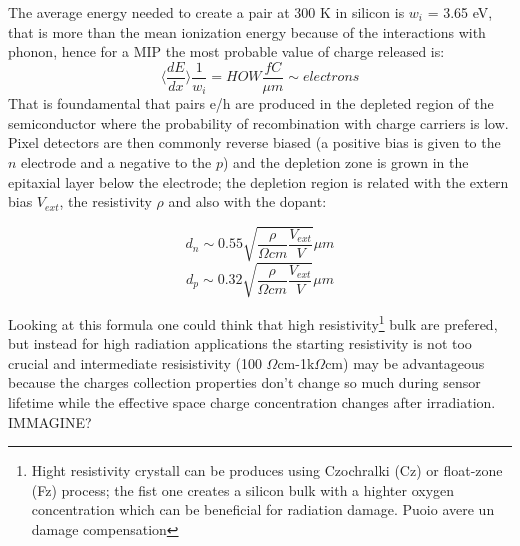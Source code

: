 \begin{titlepage}
The average energy needed to create a pair at 300 K in silicon is $w_i$ = 3.65 eV, that is more than the mean ionization energy because of the interactions with phonon, hence for a MIP the most probable value of charge released is: 
\begin{equation}
   \langle \frac{dE}{dx}\rangle \frac{1}{w_i} = HOW \frac{fC}{\mu m} \sim electrons
\end{equation}
That is foundamental that pairs e/h are produced in the depleted region of the semiconductor where the probability of recombination with charge carriers is low.\\
Pixel detectors are then commonly reverse biased (a positive bias is given to the $n$ electrode and a negative to the $p$) and the depletion zone is grown in the epitaxial layer below the electrode; the depletion region is related with the extern bias $V_{ext}$, the resistivity $\rho$ and also with the dopant:
\begin{multicols}{2}
\begin{equation}
   d_{n} \sim 0.55 \sqrt{\frac{\rho}{\Omega cm}\frac{V_{ext}}{V}} \mu m 
\end{equation}\break
\begin{equation}
   d_{p} \sim 0.32 \sqrt{\frac{\rho}{\Omega cm}\frac{V_{ext}}{V}} \mu m
\end{equation}
\label{eq:deplation_d}
\end{multicols}
Looking at this formula one could think that high resistivity\footnote{Hight resistivity crystall can be produces using Czochralki (Cz) or float-zone (Fz) process; the fist one creates a silicon bulk with a highter oxygen concentration which can be beneficial for radiation damage. Puoio avere un damage compensation} bulk are prefered, but instead for high radiation applications the starting resistivity is not too crucial and intermediate resisistivity (100 $\Omega$cm-1k$\Omega$cm) may be advantageous because the charges collection properties don't change so much during sensor lifetime while the effective space charge concentration changes after irradiation. IMMAGINE?\\


\end{titlepage}
